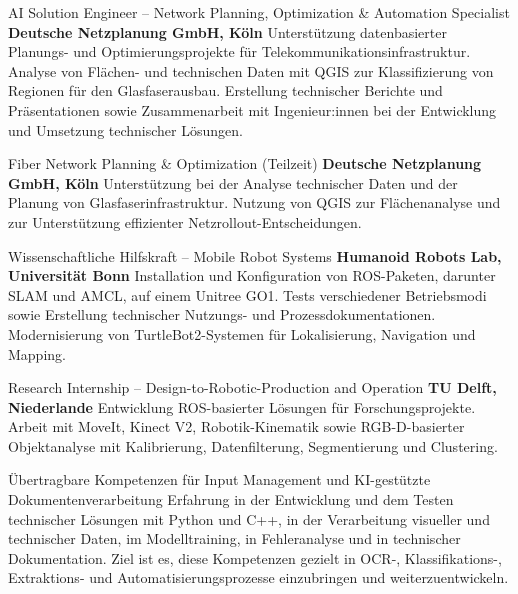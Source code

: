 \documentclass[
  a4paper, 
   maincolor=cvblue,
   sectioncolor=cvblue,
]{fortysecondscv}
\begin{document}
\newpage
\restoregeometry
{}\paperwidth

\makefrontsidebar

\begin{cvtable}
	{\color{cvsectioncolor}AI Solution Engineer -- Network Planning, Optimization \& Automation Specialist}
	{\textbf{Deutsche Netzplanung GmbH, Köln}}
	{Unterstützung datenbasierter Planungs- und Optimierungsprojekte für Telekommunikationsinfrastruktur. Analyse von Flächen- und technischen Daten mit QGIS zur Klassifizierung von Regionen für den Glasfaserausbau. Erstellung technischer Berichte und Präsentationen sowie Zusammenarbeit mit Ingenieur:innen bei der Entwicklung und Umsetzung technischer Lösungen.}

	{\color{cvsectioncolor}Fiber Network Planning \& Optimization (Teilzeit)}
	{\textbf{Deutsche Netzplanung GmbH, Köln}}
	{Unterstützung bei der Analyse technischer Daten und der Planung von Glasfaserinfrastruktur. Nutzung von QGIS zur Flächenanalyse und zur Unterstützung effizienter Netzrollout-Entscheidungen.}

	{\color{cvsectioncolor}Wissenschaftliche Hilfskraft -- Mobile Robot Systems}
	{\textbf{Humanoid Robots Lab, Universität Bonn}}
	{Installation und Konfiguration von ROS-Paketen, darunter SLAM und AMCL, auf einem Unitree GO1. Tests verschiedener Betriebsmodi sowie Erstellung technischer Nutzungs- und Prozessdokumentationen. Modernisierung von TurtleBot2-Systemen für Lokalisierung, Navigation und Mapping.}

	{\color{cvsectioncolor}Research Internship -- Design-to-Robotic-Production and Operation}
	{\textbf{TU Delft, Niederlande}}
	{Entwicklung ROS-basierter Lösungen für Forschungsprojekte. Arbeit mit MoveIt, Kinect V2, Robotik-Kinematik sowie RGB-D-basierter Objektanalyse mit Kalibrierung, Datenfilterung, Segmentierung und Clustering.}
\end{cvtable}

\begin{cvtable}
	\cvitem{}
	{\color{cvsectioncolor}Übertragbare Kompetenzen für Input Management und KI-gestützte Dokumentenverarbeitung}
	{}
	{Erfahrung in der Entwicklung und dem Testen technischer Lösungen mit Python und C++, in der Verarbeitung visueller und technischer Daten, im Modelltraining, in Fehleranalyse und in technischer Dokumentation. Ziel ist es, diese Kompetenzen gezielt in OCR-, Klassifikations-, Extraktions- und Automatisierungsprozesse einzubringen und weiterzuentwickeln.}
\end{cvtable}
\end{document}
